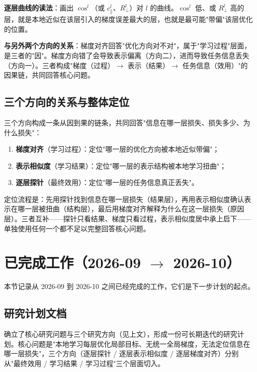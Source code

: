 \documentclass[journal,12pt,onecolumn]{IEEEtran}
\begin{document}
\textbf{逐层曲线的读法}：画出 $\cos^l$（或 $c^l_{\parallel}$、$R^l_{\perp}$）对 $l$ 的曲线。$\cos^l$ 低、或 $R^l_{\perp}$ 高的层，就是本地近似在该层引入的梯度误差最大的层，也就是最可能"带偏"该层优化的位置。

\textbf{与另外两个方向的关系}：梯度对齐回答"优化方向对不对"，属于"学习过程"层面，是三者的"因"。梯度方向错了会导致表示偏离（方向二），进而导致任务信息丢失（方向一）。三者构成"梯度（过程）$\to$ 表示（结果）$\to$ 任务信息（效用）"的因果链，共同回答核心问题。

\subsection{三个方向的关系与整体定位}

三个方向构成一条从因到果的链条，共同回答"信息在哪一层损失、损失多少、为什么损失"：

\begin{enumerate}[leftmargin=1.5em,itemsep=0pt]
\item \textbf{梯度对齐}（学习过程）：定位"哪一层的优化方向被本地近似带偏"；
\item \textbf{表示相似度}（学习结果）：定位"哪一层的表示结构被本地学习扭曲"；
\item \textbf{逐层探针}（最终效用）：定位"哪一层的任务信息真正丢失"。
\end{enumerate}

定位流程是：先用探针找到信息在哪一层损失（结果层），再用表示相似度确认表示在哪一层被扭曲（结构层），最后用梯度对齐解释为什么在这一层损失（原因层）。三者互补——探针只看结果、梯度只看过程，表示相似度居中承上启下——单独使用任何一个都不足以完整回答核心问题。

\section{已完成工作（2026-09 $\to$ 2026-10）}

本节记录从 2026-09 到 2026-10 之间已经完成的工作，它们是下一步计划的起点。

\subsection{研究计划文档}

确立了核心研究问题与三个研究方向（见上文），形成一份可长期迭代的研究计划。核心问题是"本地学习每层优化局部目标、无统一全局梯度，无法定位信息在哪一层损失"，三个方向（逐层探针 / 逐层表示相似度 / 逐层梯度对齐）分别从"最终效用 / 学习结果 / 学习过程"三个层面切入。
\end{document}
